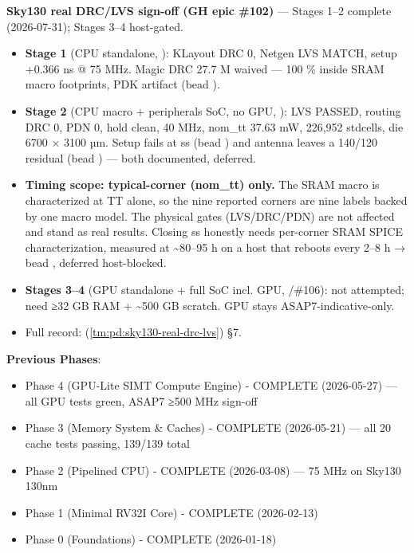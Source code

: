 \begin{record}
\textbf{Sky130 real DRC/LVS sign-off (GH epic \#102)} --- Stages 1--2
\ok{} complete (2026-07-31); Stages 3--4 \hold{} host-gated.

\begin{itemize}
\tightlist
\item
  \textbf{Stage 1} (CPU standalone, ): KLayout DRC 0, Netgen LVS
  MATCH, setup +0.366 ns @ 75 MHz. Magic DRC 27.7 M waived --- 100 \%
  inside SRAM macro footprints, PDK artifact (bead ).
\item
  \textbf{Stage 2} (CPU macro + peripherals SoC, no GPU, ): LVS
  PASSED, routing DRC 0, PDN 0, hold clean, 40 MHz, nom\_tt 37.63 mW,
  226,952 stdcells, die 6700 × 3100 µm. Setup fails at ss (bead
  ) and antenna leaves a 140/120 residual (bead )
  --- both documented, deferred.
\item
  \warn{} \textbf{Timing scope: typical-corner (nom\_tt) only.} The SRAM
  macro is characterized at TT alone, so the nine reported corners are
  nine labels backed by one macro model. The physical gates
  (LVS/\allowbreak{}DRC/\allowbreak{}PDN) are not affected and stand as
  real results. Closing ss honestly needs per-corner SRAM SPICE
  characterization, measured at \textasciitilde80--95 h on a host that
  reboots every 2--8 h → bead , deferred host-blocked.
\item
  \textbf{Stages 3--4} (GPU standalone + full SoC incl. GPU, /\allowbreak{}\#106): not attempted; need ≥32 GB RAM +
  \textasciitilde500 GB scratch. GPU stays ASAP7-indicative-only.
\item
  Full record:  (\cref{tm:pd:sky130-real-drc-lvs}) §7.
\end{itemize}

\textbf{Previous Phases}:

\begin{itemize}
\tightlist
\item
  Phase 4 (GPU-Lite SIMT Compute Engine) - \ok{} COMPLETE (2026-05-27)
  --- all GPU tests green, ASAP7 ≥500 MHz sign-off
\item
  Phase 3 (Memory System \& Caches) - \ok{} COMPLETE (2026-05-21) ---
  all 20 cache tests passing, 139/139 total
\item
  Phase 2 (Pipelined CPU) - \ok{} COMPLETE (2026-03-08) --- 75 MHz on
  Sky130 130nm
\item
  Phase 1 (Minimal RV32I Core) - \ok{} COMPLETE (2026-02-13)
\item
  Phase 0 (Foundations) - \ok{} COMPLETE (2026-01-18)
\end{itemize}

\end{record}

